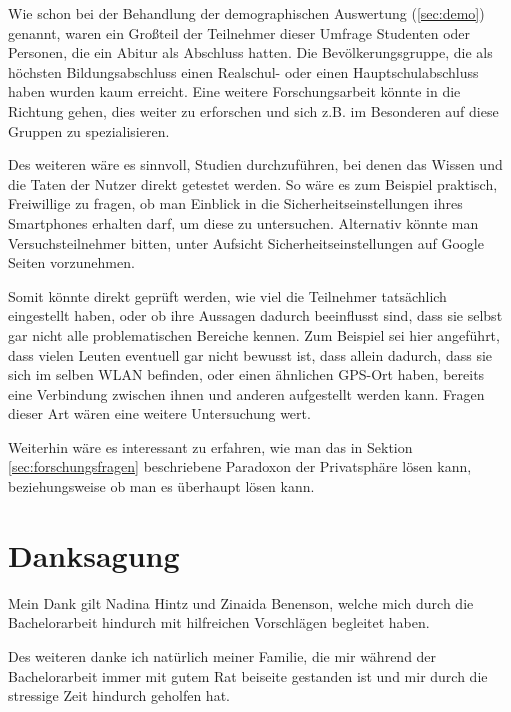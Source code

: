 Wie schon bei der Behandlung der demographischen Auswertung (\ref{sec:demo}) genannt, waren ein Großteil der Teilnehmer dieser Umfrage Studenten oder Personen, die ein Abitur als Abschluss hatten. Die Bevölkerungsgruppe, die als höchsten Bildungsabschluss einen Realschul- oder einen Hauptschulabschluss haben wurden kaum erreicht. Eine weitere Forschungsarbeit könnte in die Richtung gehen, dies weiter zu erforschen und sich z.B. im Besonderen auf diese Gruppen zu spezialisieren.

Des weiteren wäre es sinnvoll, Studien durchzuführen, bei denen das Wissen und die Taten der Nutzer direkt getestet werden. So wäre es zum Beispiel praktisch, Freiwillige zu fragen, ob man Einblick in die Sicherheitseinstellungen ihres Smartphones erhalten darf, um diese zu untersuchen. Alternativ könnte man Versuchsteilnehmer bitten, unter Aufsicht Sicherheitseinstellungen auf Google Seiten vorzunehmen.

Somit könnte direkt geprüft werden, wie viel die Teilnehmer tatsächlich eingestellt haben, oder ob ihre Aussagen dadurch beeinflusst sind, dass sie selbst gar nicht alle problematischen Bereiche kennen. Zum Beispiel sei hier angeführt, dass vielen Leuten eventuell gar nicht bewusst ist, dass allein dadurch, dass sie sich im selben WLAN befinden, oder einen ähnlichen GPS-Ort haben, bereits eine Verbindung zwischen ihnen und anderen aufgestellt werden kann. Fragen dieser Art wären eine weitere Untersuchung wert.

Weiterhin wäre es interessant zu erfahren, wie man das in Sektion \ref{sec:forschungsfragen} beschriebene Paradoxon der Privatsphäre lösen kann, beziehungsweise ob man es überhaupt lösen kann.


\chapter{Danksagung}
Mein Dank gilt Nadina Hintz und Zinaida Benenson, welche mich durch die Bachelorarbeit hindurch mit hilfreichen Vorschlägen begleitet haben.

Des weiteren danke ich natürlich meiner Familie, die mir während der Bachelorarbeit immer mit gutem Rat beiseite gestanden ist und mir durch die stressige Zeit hindurch geholfen hat.
